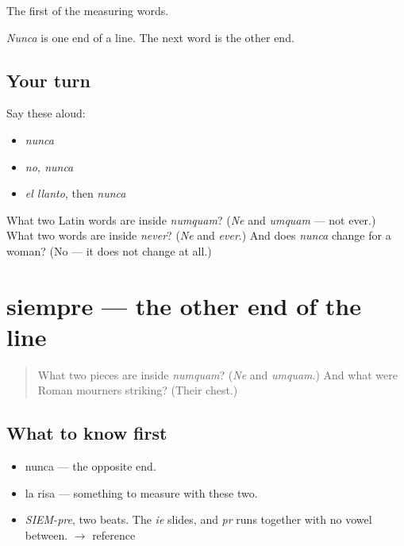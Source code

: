\begin{grammarlens}[title={What you've built}]
The first of the measuring words.

\emph{Nunca} is one end of a line. The next word is the other end.
\end{grammarlens}

\subsection*{Your turn}
Say these aloud:

\begin{itemize}
\raggedright
  \item \emph{nunca}
  \item \emph{no, nunca}
  \item \emph{el llanto}, then \emph{nunca}
\end{itemize}

\begin{tcolorbox}[breakable,colback=teal!4,colframe=teal!35!black,title={Before you move on}]
What two Latin words are inside \emph{numquam}? (\emph{Ne} and \emph{umquam} — not ever.) What two words are inside \emph{never}? (\emph{Ne} and \emph{ever}.) And does \emph{nunca} change for a woman? (No — it does not change at all.)
\end{tcolorbox}
\section[siempre]{siempre — the other end of the line}

\label{lesson:ES-C316-siempre}



\begin{quote}
What two pieces are inside \emph{numquam}? (\emph{Ne} and \emph{umquam}.) And what were Roman mourners striking? (Their chest.)
\end{quote}

\subsection*{What to know first}
\begin{itemize}
\raggedright
  \item nunca — the opposite end.
  \item la risa — something to measure with these two.
\end{itemize}

\begin{sounds}
\begin{itemize}
\raggedright
  \item \emph{SIEM-pre}, two beats. The \emph{ie} slides, and \emph{pr} runs together with no vowel between. $\to$ reference
\end{itemize}
\end{sounds}

